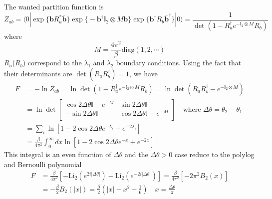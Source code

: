 \documentclass{article}
\renewcommand{\vec}[1]{\boldsymbol{\mathbf{#1}}}
\begin{document}
The wanted partition function is
\begin{equation}
Z_{ab} = \langle 0 | \exp\Big\{ \vec{b} R_a^* \vec{\bar{b}}\Big\} \exp\Big\{ - \vec{b}^{\dagger} \mathbb{I}_2 \otimes M  \vec{b} \Big\}   \exp\Big\{  \vec{b}^{\dagger} R_b  \vec{\bar{b}}^{\dagger}\Big\}  |0  \rangle  = \frac{1}{\det ( 1 - R^{\dagger} _a  e^{- \mathbb{I}_2 \otimes M} R_b) }
\end{equation}
where
\begin{equation}
M =  \frac{4\pi^2}{\beta} \text{diag}( 1, 2, \cdots )
\end{equation}
$R_a$($R_b$) correspond to the $\lambda_1$ and $\lambda_2$ boundary conditions. Using the fact that their determinants are $\det( R_a R_b^{\dagger})  = 1$, we have
\begin{equation}
\begin{aligned}
F &= - \ln Z_{ab} = \ln \det( 1 - R^{\dagger} _a  e^{- \mathbb{I}_2 \otimes M} R_b ) = \ln \det ( R_a R_b^{\dagger} - e^{- \mathbb{I}_2 \otimes M} )\\
& = \ln \det 
\begin{bmatrix}
\cos 2 \Delta \theta \mathbb{I} - e^{-M}   & \sin 2 \Delta \theta \mathbb{I}\\
- \sin 2\Delta \theta \mathbb{I}  &   \cos 2 \Delta \theta \mathbb{I} - e^{-M} \\ 
\end{bmatrix} \quad \text{where } \Delta \theta = \theta_2 - \theta_1 \\
& = \sum_i \ln [ 1 - 2 \cos 2 \Delta \theta e^{- \lambda_i } + e^{- 2 \lambda_i }  ] \\
& = \frac{\beta}{4\pi^2} \int_0^{\infty} dx \ln [ 1 - 2 \cos 2 \Delta \theta e^{-x} + e^{-2x} ] 
\end{aligned}
\end{equation}
This integral is an even function of $\Delta \theta$ and the $\Delta \theta > 0$ case reduce to the polylog and Bernoulli polynomial
\begin{equation}
\begin{aligned}
  F &= \frac{\beta}{4\pi^2} \left[ - \text{Li}_2 ( e^{2i |\Delta \theta|} ) - \text{Li}_2 ( e^{- 2i |\Delta \theta|} ) \right]  = \frac{\beta}{4\pi^2}  \left[ - 2\pi^2 B_2 (x) \right] \\
  &= - \frac{\beta}{2} B_2( |x| ) = \frac{\beta}{2} (|x| - x^2 - \frac{1}{6}) \quad x = \frac{\Delta \theta}{ \pi} \\
\end{aligned}
\end{equation}
\end{document}
